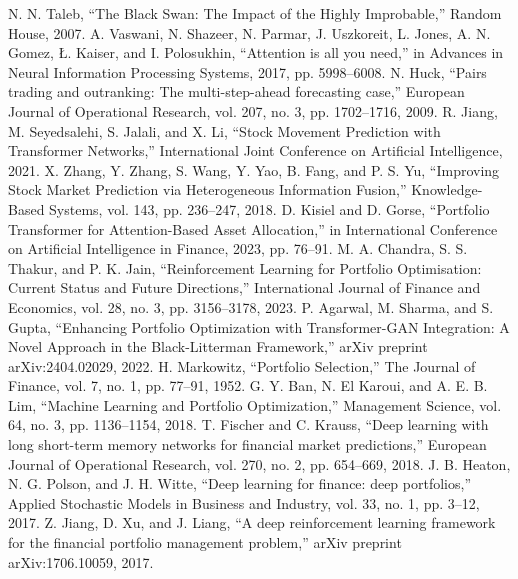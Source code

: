 \documentclass[conference]{IEEEtran}
\begin{document}
\begin{thebibliography}{00}
 N. N. Taleb, ``The Black Swan: The Impact of the Highly Improbable,'' Random House, 2007.
 A. Vaswani, N. Shazeer, N. Parmar, J. Uszkoreit, L. Jones, A. N. Gomez, Ł. Kaiser, and I. Polosukhin, ``Attention is all you need,'' in Advances in Neural Information Processing Systems, 2017, pp. 5998--6008.
 N. Huck, ``Pairs trading and outranking: The multi-step-ahead forecasting case,'' European Journal of Operational Research, vol. 207, no. 3, pp. 1702--1716, 2009.
 R. Jiang, M. Seyedsalehi, S. Jalali, and X. Li, ``Stock Movement Prediction with Transformer Networks,'' International Joint Conference on Artificial Intelligence, 2021.
 X. Zhang, Y. Zhang, S. Wang, Y. Yao, B. Fang, and P. S. Yu, ``Improving Stock Market Prediction via Heterogeneous Information Fusion,'' Knowledge-Based Systems, vol. 143, pp. 236--247, 2018.
 D. Kisiel and D. Gorse, ``Portfolio Transformer for Attention-Based Asset Allocation,'' in International Conference on Artificial Intelligence in Finance, 2023, pp. 76--91.
 M. A. Chandra, S. S. Thakur, and P. K. Jain, ``Reinforcement Learning for Portfolio Optimisation: Current Status and Future Directions,'' International Journal of Finance and Economics, vol. 28, no. 3, pp. 3156--3178, 2023.
 P. Agarwal, M. Sharma, and S. Gupta, ``Enhancing Portfolio Optimization with Transformer-GAN Integration: A Novel Approach in the Black-Litterman Framework,'' arXiv preprint arXiv:2404.02029, 2022.
 H. Markowitz, ``Portfolio Selection,'' The Journal of Finance, vol. 7, no. 1, pp. 77--91, 1952.
 G. Y. Ban, N. El Karoui, and A. E. B. Lim, ``Machine Learning and Portfolio Optimization,'' Management Science, vol. 64, no. 3, pp. 1136--1154, 2018.
 T. Fischer and C. Krauss, ``Deep learning with long short-term memory networks for financial market predictions,'' European Journal of Operational Research, vol. 270, no. 2, pp. 654--669, 2018.
 J. B. Heaton, N. G. Polson, and J. H. Witte, ``Deep learning for finance: deep portfolios,'' Applied Stochastic Models in Business and Industry, vol. 33, no. 1, pp. 3--12, 2017.
 Z. Jiang, D. Xu, and J. Liang, ``A deep reinforcement learning framework for the financial portfolio management problem,'' arXiv preprint arXiv:1706.10059, 2017.

\end{thebibliography}
\end{document}
